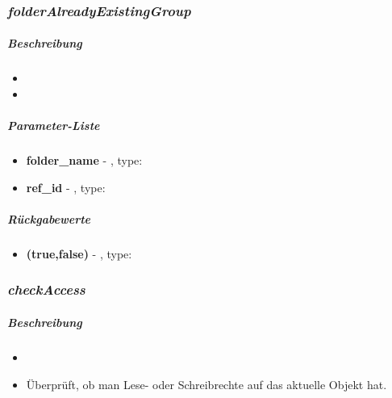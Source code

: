 \subsubsection*{\textit{folderAlreadyExistingGroup}}\label{folderAlreadyExistingGroupGGUI}
\subparagraph{Beschreibung}
\begin{itemize}
	\item[] \noindent{}
	\item[] 
\end{itemize}
\subparagraph{Parameter-Liste}
\begin{itemize}
	\item[] \textbf{folder\_name} - , type: 
	\item[] \textbf{ref\_id} - , type:
\end{itemize}
\subparagraph{Rückgabewerte}
\begin{itemize}
	\item[] \textbf{(true,false)} - , type: 
\end{itemize}

\subsubsection*{\textit{checkAccess}}\label{checkAccessGGUI}
\subparagraph{Beschreibung}
\begin{itemize}
	\item[] \noindent{}
	\item[] Überprüft, ob man Lese- oder Schreibrechte auf das aktuelle Objekt hat.
\end{itemize}